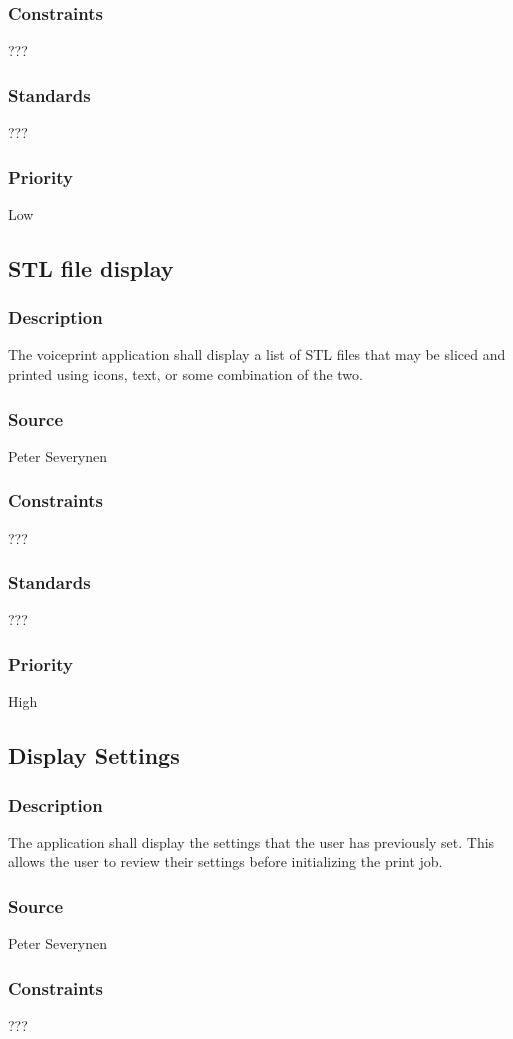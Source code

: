 \subsubsection{Constraints}
???
\subsubsection{Standards}
???
\subsubsection{Priority}
Low
\subsection{STL file display}
\subsubsection{Description}
The voiceprint application shall display a list of STL files that may be sliced and printed using icons, text, or some combination of the two.
\subsubsection{Source}
Peter Severynen
\subsubsection{Constraints}
???
\subsubsection{Standards}
???
\subsubsection{Priority}
High
\subsection{Display Settings}
\subsubsection{Description}
The application shall display the settings that the user has previously set. This allows the user to review their settings before initializing the print job.
\subsubsection{Source}
Peter Severynen
\subsubsection{Constraints}
???
